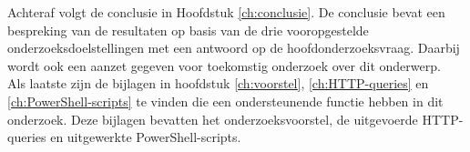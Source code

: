 Achteraf volgt de conclusie in Hoofdstuk \ref{ch:conclusie}. De conclusie bevat een bespreking van de resultaten op basis van de drie vooropgestelde onderzoeksdoelstellingen met een antwoord op de hoofdonderzoeksvraag. Daarbij wordt ook een aanzet gegeven voor toekomstig onderzoek over dit onderwerp. \\

Als laatste zijn de bijlagen in hoofdstuk \ref{ch:voorstel}, \ref{ch:HTTP-queries} en \ref{ch:PowerShell-scripts} te vinden die een ondersteunende functie hebben in dit onderzoek. Deze bijlagen bevatten het onderzoeksvoorstel, de uitgevoerde \Ac{HTTP}-queries en uitgewerkte PowerShell-scripts.

\begin{comment}

De rest van deze bachelorproef is als volgt opgebouwd:

In Hoofdstuk~\ref{ch:stand-van-zaken} wordt een overzicht gegeven van de stand van zaken binnen het onderzoeksdomein, op basis van een literatuurstudie.

In Hoofdstuk~\ref{ch:methodologie} wordt de methodologie toegelicht en worden de gebruikte onderzoekstechnieken besproken om een antwoord te kunnen formuleren op de onderzoeksvragen.


In Hoofdstuk~\ref{ch:conclusie}, tenslotte, wordt de conclusie gegeven en een antwoord geformuleerd op de onderzoeksvragen. Daarbij wordt ook een aanzet gegeven voor toekomstig onderzoek binnen dit domein.
\end{comment}
